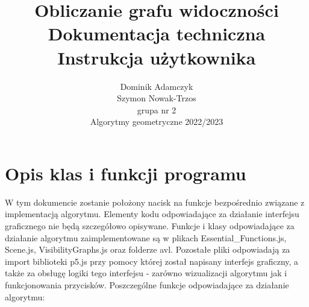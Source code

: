 \documentclass{article}
\title{\Huge Obliczanie grafu widoczności \\
\Huge Dokumentacja techniczna \\
\Huge Instrukcja użytkownika \\}
\author{\Large Dominik Adamczyk \\ \Large Szymon Nowak-Trzos \\ grupa nr 2 \\ Algorytmy geometryczne 2022/2023}
\date{}
\begin{document}
\maketitle

\newpage
\tableofcontents
\newpage


\section{Opis klas i funkcji programu}
\qquad W tym dokumencie zostanie położony nacisk na funkcje bezpośrednio związane z implementacją algorytmu. Elementy kodu odpowiadające za działanie interfejsu graficznego nie będą szczegółowo opisywane.
Funkcje i klasy odpowiadające za działanie algorytmu zaimplementowane są w plikach Essential\_Functions.js, Scene.js, VisibilityGraphs.js oraz folderze avl. Pozostałe pliki odpowiadają za import biblioteki p5.js przy pomocy której został napisany interfejs graficzny, a także za obsługę logiki tego interfejsu - zarówno wizualizacji algorytmu jak i funkcjonowania przycisków. Poszczególne funkcje odpowiadające za działanie algorytmu:
\end{document}
